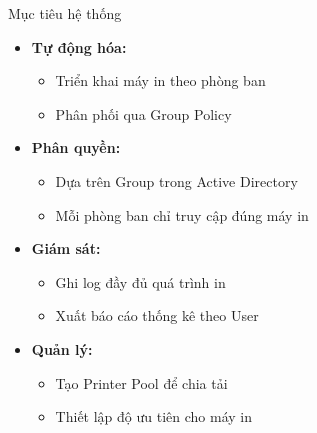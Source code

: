 \documentclass{beamer}
\begin{document}
    \begin{frame}{Mục tiêu hệ thống}
        \begin{itemize}
            \item \textbf{Tự động hóa:} 
                \begin{itemize}
                    \item Triển khai máy in theo phòng ban
                    \item Phân phối qua Group Policy
                \end{itemize}
            \item \textbf{Phân quyền:}
                \begin{itemize}
                    \item Dựa trên Group trong Active Directory
                    \item Mỗi phòng ban chỉ truy cập đúng máy in
                \end{itemize}
            \item \textbf{Giám sát:}
                \begin{itemize}
                    \item Ghi log đầy đủ quá trình in
                    \item Xuất báo cáo thống kê theo User
                \end{itemize}
            \item \textbf{Quản lý:}
                \begin{itemize}
                    \item Tạo Printer Pool để chia tải
                    \item Thiết lập độ ưu tiên cho máy in
                \end{itemize}
        \end{itemize}
    \end{frame}

\end{document}
